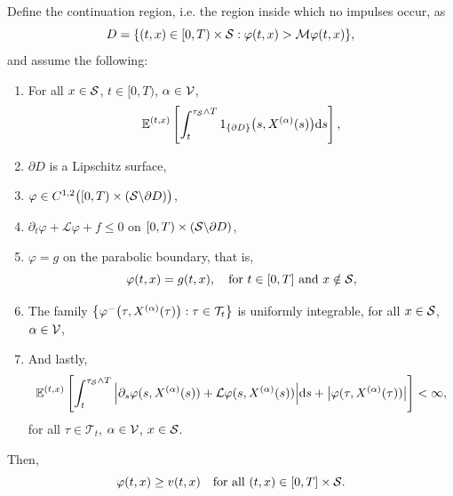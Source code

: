\begin{theorem}
\begin{enumerate}[label=(\alph*)]
        Define the continuation region, i.e. the region inside which no impulses occur, as
        \begin{equation*}
            D = \{(t,x) \in [0,T) \times \mathcal{S}: \varphi(t,x) > \mathcal{M} \varphi(t,x)\},
        \end{equation*}
        and assume the following:
        \begin{enumerate}[label=(\roman*), start=3]
            \item For all $x \in \mathcal{S}$, $t \in [0,T)$, $\alpha \in \mathcal{V}$,
            \begin{equation*}
                \mathbb{E}^{(t,x)} \left[ \int_t^{\tau_{\mathcal{S}} \wedge T} 1_{\left\{\partial D\right\}}\big(s,X^{(\alpha)}(s)\big) \mathrm{d} s\right], 
            \end{equation*}
            \item $\partial D$ is a Lipschitz surface,
            \item $\varphi \in C^{1,2}\big([0,T)\times (\mathcal{S} \backslash \partial D) \big)$,
            \item $\partial_t \varphi + \mathcal L \varphi + f \leq 0$ on $[0,T) \times (\mathcal{S} \backslash \partial D)$,
            \item $\varphi = g$ on the parabolic boundary, that is, 
            \begin{equation*}
                \varphi(t,x) = g(t,x), \quad \text{for } t \in [0,T] \text{ and } x \notin \mathcal{S},
            \end{equation*}
            \item The family $\big\{ \varphi^- \big(\tau,X^{(\alpha)}(\tau)\big): \tau \in \mathcal{T}_t \big\}$ is uniformly integrable, for all $x \in \mathcal{S}$, $\alpha \in \mathcal{V}$,
            \item And lastly, 
            \begin{equation*}
                \mathbb{E}^{(t,x)} \left[ \int_t^{\tau_{\mathcal{S}} \wedge T} \Big|\partial_s \varphi(s,X^{(\alpha)}(s)) + \mathcal{L}\varphi(s,X^{(\alpha)}(s)) \Big| \mathrm{d} s + \big| \varphi(\tau,X^{(\alpha)}(\tau)) \big| \right] < \infty,
            \end{equation*}
            for all $\tau \in \mathcal{T}_t$, $\alpha \in \mathcal{V}$, $x \in \mathcal{S}$.
        \end{enumerate}
        Then,
        \begin{equation}
            \varphi(t,x) \geq v(t,x) \quad \text{for all } (t,x) \in [0,T] \times \mathcal{S}.
            \label{eqn: ØS theorem 9.2, first ineq}
        \end{equation}

\end{enumerate}
\end{theorem}
